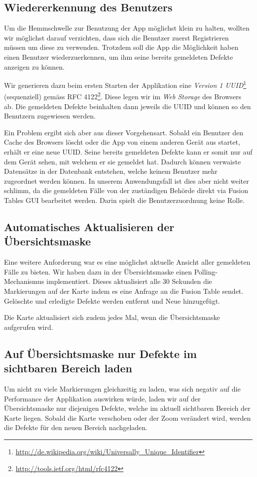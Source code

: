 \subsection{Wiedererkennung des Benutzers}
\label{fixmystreet-user-detection}
Um die Hemmschwelle zur Benutzung der App möglichst klein zu halten, wollten wir möglichst darauf verzichten, dass sich die Benutzer zuerst Registrieren müssen um diese zu verwenden. Trotzdem soll die App die Möglichkeit haben einen Benutzer wiederzuerkennen, um ihm seine bereits gemeldeten Defekte anzeigen zu können.

Wir generieren dazu beim ersten Starten der Applikation eine \emph{Version 1 UUID}\footnote{\url{http://de.wikipedia.org/wiki/Universally_Unique_Identifier}} (sequenziell) gemäss RFC 4122\footnote{\url{http://tools.ietf.org/html/rfc4122}}. Diese legen wir im \emph{Web Storage} des Browsers ab. Die gemeldeten Defekte beinhalten dann jeweils die UUID und können so den Benutzern zugewiesen werden.

Ein Problem ergibt sich aber aus dieser Vorgehensart. Sobald ein Benutzer den Cache des Browsers löscht oder die App von einem anderen Gerät aus startet, erhält er eine neue UUID. Seine bereits gemeldeten Defekte kann er somit nur auf dem Gerät sehen, mit welchem er sie gemeldet hat. Dadurch können verwaiste Datensätze in der Datenbank entstehen, welche keinem Benutzer mehr zugeordnet werden können. In unserem Anwendungsfall ist dies aber nicht weiter schlimm, da die gemeldeten Fälle von der zuständigen Behörde direkt via Fusion Tables GUI bearbeitet werden. Darin spielt die Benutzerzuordnung keine Rolle.

\subsection{Automatisches Aktualisieren der Übersichtsmaske}
\label{fixmystreet-polling}
Eine weitere Anforderung war es eine möglichst aktuelle Ansicht aller gemeldeten Fälle zu bieten. Wir haben dazu in der Übersichtsmaske einen Polling-Mechanismus implementiert. Dieses aktualisiert alle 30 Sekunden die Markierungen auf der Karte indem es eine Anfrage an die Fusion Table sendet. Gelöschte und erledigte Defekte werden entfernt und Neue hinzugefügt.

Die Karte aktualisiert sich zudem jedes Mal, wenn die Übersichtsmaske aufgerufen wird.

\subsection{Auf Übersichtsmaske nur Defekte im sichtbaren Bereich laden}
Um nicht zu viele Markierungen gleichzeitig zu laden, was sich negativ auf die Performance der Applikation auswirken würde, laden wir auf der Übersichtsmaske nur diejenigen Defekte, welche im aktuell sichtbaren Bereich der Karte liegen. Sobald die Karte verschoben oder der Zoom verändert wird, werden die Defekte für den neuen Bereich nachgeladen.


